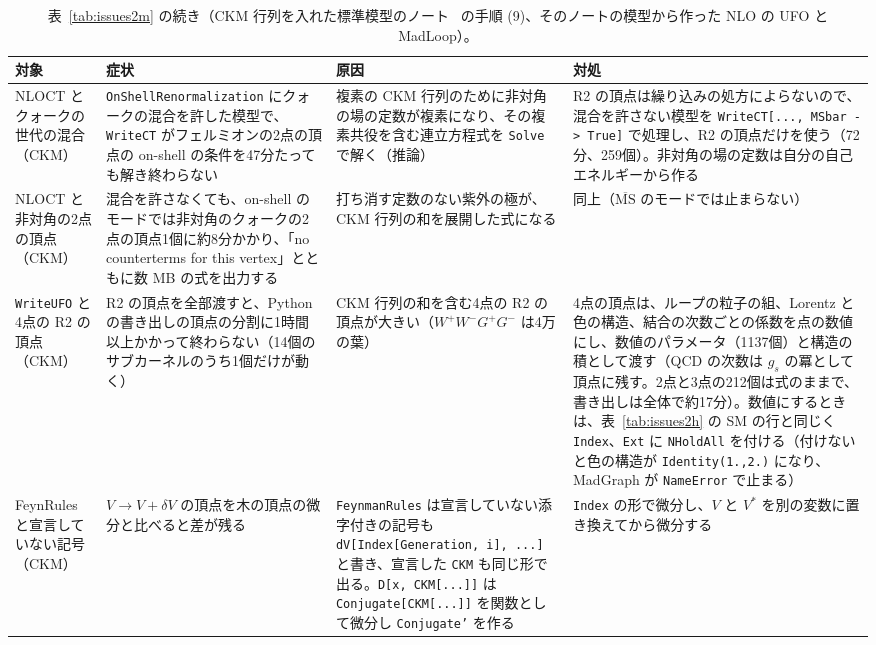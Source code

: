 \documentclass[a4paper,10pt]{ltjsarticle}
\begin{document}
\begin{table}[tbp]
\centering\footnotesize
\caption{表~\ref{tab:issues2m} の続き（CKM 行列を入れた標準模型のノート~\cite{smckmnote} の手順 (9)、そのノートの模型から作った NLO の UFO と MadLoop）。}
\label{tab:issues2n}
\begin{tabularx}{\linewidth}{>{\raggedright\arraybackslash}p{2.4cm}>{\raggedright\arraybackslash}X>{\raggedright\arraybackslash}X>{\raggedright\arraybackslash}X}
\toprule
\textbf{対象} & \textbf{症状} & \textbf{原因} & \textbf{対処} \\
\midrule
NLOCT とクォークの世代の混合（CKM） & \texttt{OnShellRenormalization} にクォークの混合を許した模型で、\texttt{WriteCT} がフェルミオンの2点の頂点の on-shell の条件を47分たっても解き終わらない & 複素の CKM 行列のために非対角の場の定数が複素になり、その複素共役を含む連立方程式を \texttt{Solve} で解く（推論） & R2 の頂点は繰り込みの処方によらないので、混合を許さない模型を \texttt{WriteCT[..., MSbar -> True]} で処理し、R2 の頂点だけを使う（72分、259個）。非対角の場の定数は自分の自己エネルギーから作る \\
NLOCT と非対角の2点の頂点（CKM） & 混合を許さなくても、on-shell のモードでは非対角のクォークの2点の頂点1個に約8分かかり、「no counterterms for this vertex」とともに数 MB の式を出力する & 打ち消す定数のない紫外の極が、CKM 行列の和を展開した式になる & 同上（$\overline{\mathrm{MS}}$ のモードでは止まらない） \\
\texttt{WriteUFO} と4点の R2 の頂点（CKM） & R2 の頂点を全部渡すと、Python の書き出しの頂点の分割に1時間以上かかって終わらない（14個のサブカーネルのうち1個だけが動く） & CKM 行列の和を含む4点の R2 の頂点が大きい（$W^+W^-G^+G^-$ は4万の葉） & 4点の頂点は、ループの粒子の組、Lorentz と色の構造、結合の次数ごとの係数を点の数値にし、数値のパラメータ（1137個）と構造の積として渡す（QCD の次数は $g_s$ の冪として頂点に残す。2点と3点の212個は式のままで、書き出しは全体で約17分）。数値にするときは、表~\ref{tab:issues2h} の SM の行と同じく \texttt{Index}、\texttt{Ext} に \texttt{NHoldAll} を付ける（付けないと色の構造が \texttt{Identity(1.,2.)} になり、MadGraph が \texttt{NameError} で止まる） \\
FeynRules と宣言していない記号（CKM） & $V\to V+\delta V$ の頂点を木の頂点の微分と比べると差が残る & \texttt{FeynmanRules} は宣言していない添字付きの記号も \texttt{dV[Index[}\allowbreak\texttt{Generation, i], ...]} と書き、宣言した \texttt{CKM} も同じ形で出る。\texttt{D[x, CKM[...]]} は \texttt{Conjugate[CKM[...]]} を関数として微分し \texttt{Conjugate'} を作る & \texttt{Index} の形で微分し、$V$ と $V^*$ を別の変数に置き換えてから微分する \\

\end{tabularx}
\end{table}
\end{document}
